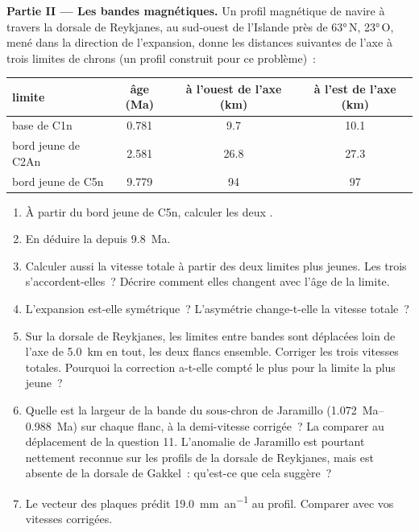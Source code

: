 \begin{problem}
\noindent\textbf{Partie II --- Les bandes magnétiques.}
Un profil magnétique de navire à travers la dorsale de Reykjanes, au sud-ouest de l'Islande près de
\ang{63}\,N, \ang{23}\,O, mené dans la direction de l'expansion, donne les distances suivantes
de l'axe à trois limites de chrons (un profil construit pour
ce problème)~:
\begin{center}\small
\begin{tabular}{lccc}
\hline
limite & âge (Ma) & à l'ouest de l'axe (km) & à l'est de l'axe (km)\\
\hline
base de C1n & 0.781 & 9.7 & 10.1\\
bord jeune de C2An & 2.581 & 26.8 & 27.3\\
bord jeune de C5n & 9.779 & 94 & 97\\
\hline
\end{tabular}
\end{center}
\begin{enumerate}[resume]
  \item À partir du bord jeune de C5n, calculer les deux .
  \item En déduire la  depuis \qty{9.8}{Ma}.
  \item Calculer aussi la vitesse totale à partir des deux limites plus jeunes. Les
        trois s'accordent-elles~? Décrire comment elles changent avec l'âge de la limite.
  \item L'expansion est-elle symétrique~? L'asymétrie change-t-elle la vitesse totale~?
  \item Sur la dorsale de Reykjanes, les limites entre bandes sont déplacées
        loin de l'axe de \qty{5.0}{km} en tout, les deux flancs ensemble.
        Corriger les trois vitesses totales. Pourquoi la correction a-t-elle compté le plus pour
        la limite la plus jeune~?
  \item Quelle est la largeur de la bande du sous-chron de Jaramillo
        (\qtyrange{1.072}{0.988}{Ma}) sur chaque flanc, à la demi-vitesse
        corrigée~? La comparer au déplacement de la question 11. L'anomalie de
        Jaramillo est pourtant nettement reconnue sur les profils de la dorsale de Reykjanes,
        mais est absente de la dorsale de Gakkel~: qu'est-ce que cela suggère~?
  \item Le vecteur des plaques prédit \qty{19.0}{mm.an^{-1}} au profil. Comparer
        avec vos vitesses corrigées.
\end{enumerate}


\end{problem}
